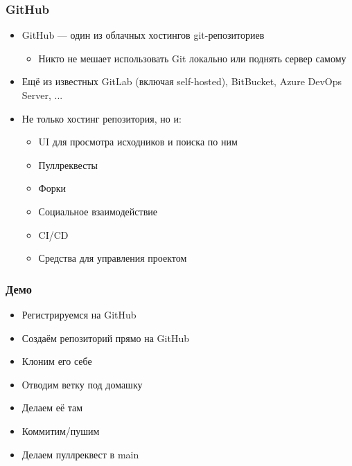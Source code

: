 \documentclass{../../slides-style}
\begin{document}
    \begin{frame}
        \frametitle{GitHub}
        \begin{itemize}
            \item GitHub --- один из облачных хостингов git-репозиториев
            \begin{itemize}
                \item Никто не мешает использовать Git локально или поднять сервер самому
            \end{itemize}
            \item Ещё из известных GitLab (включая self-hosted), BitBucket, Azure DevOps Server, ...
            \item Не только хостинг репозитория, но и:
            \begin{itemize}
                \item UI для просмотра исходников и поиска по ним
                \item Пуллреквесты
                \item Форки
                \item Социальное взаимодействие
                \item CI/CD
                \item Средства для управления проектом
            \end{itemize}
        \end{itemize}
    \end{frame}

    \begin{frame}
        \frametitle{Демо}
        \begin{itemize}
            \item Регистрируемся на GitHub
            \item Создаём репозиторий прямо на GitHub
            \item Клоним его себе
            \item Отводим ветку под домашку
            \item Делаем её там
            \item Коммитим/пушим
            \item Делаем пуллреквест в main
        \end{itemize}
    \end{frame}
\end{document}
